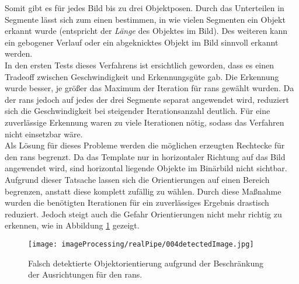 Somit gibt es für jedes Bild bis zu drei Objektposen. Durch das Unterteilen in Segmente lässt sich zum einen bestimmen, in wie vielen Segmenten ein Objekt erkannt wurde (entspricht der \textit{Länge} des Objektes im Bild). Des weiteren kann ein gebogener Verlauf oder ein abgeknicktes Objekt im Bild sinnvoll erkannt werden.\\
In den ersten Tests dieses Verfahrens ist ersichtlich geworden, dass es einen Tradeoff zwischen Geschwindigkeit und Erkennungsgüte gab. Die Erkennung wurde besser, je größer das Maximum der Iteration für \gls{rans} gewählt wurden. Da der \gls{rans} jedoch auf jedes der drei Segmente separat angewendet wird, reduziert sich die Geschwindigkeit bei steigender Iterationsanzahl deutlich. Für eine zuverlässige Erkennung waren zu viele Iterationen nötig, sodass das Verfahren nicht einsetzbar wäre.\\
Als Lösung für dieses Probleme werden die möglichen erzeugten Rechtecke für den \gls{rans} begrenzt. Da das Template nur in horizontaler Richtung auf das Bild angewendet wird, sind horizontal liegende Objekte im Binärbild nicht sichtbar. Aufgrund dieser Tatsache lassen sich die Orientierungen auf einen Bereich begrenzen, anstatt diese komplett zufällig zu wählen. Durch diese Maßnahme wurden die benötigten Iterationen für ein zuverlässiges Ergebnis drastisch reduziert. Jedoch steigt auch die Gefahr Orientierungen nicht mehr richtig zu erkennen, wie in Abbildung \ref{detecFail} gezeigt.\\
\begin{figure}[H]
\centering
\texttt{[image: imageProcessing/realPipe/004detectedImage.jpg]}
\caption[Orientierung aufgrund von Beschränkung des \gls{rans} falsch detektiert]{Falsch detektierte Objektorientierung aufgrund der Beschränkung der Ausrichtungen für den \gls{rans}.}
\label{detecFail}
\end{figure}

